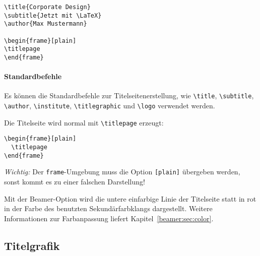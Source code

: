 \begin{minipage}{0.5\textwidth}
\begin{verbatim}
\title{Corporate Design}
\subtitle{Jetzt mit \LaTeX}
\author{Max Mustermann}

\begin{frame}[plain]
\titlepage
\end{frame}
\end{verbatim}
\end{minipage}

\begin{minipage}{0.5\textwidth}
\end{minipage}

\paragraph{Standardbefehle}

Es können die Standardbefehle zur Titelseitenerstellung, wie
\lstinline{\title},
\lstinline{\subtitle},
\lstinline{\author},
\lstinline{\institute},
\lstinline{\titlegraphic}
und \lstinline{\logo} verwendet werden.

Die Titelseite wird normal mit \lstinline{\titlepage} erzeugt:

\begin{lstlisting}
\begin{frame}[plain]
  \titlepage
\end{frame}
\end{lstlisting}

\emph{Wichtig:} Der \lstinline{frame}-Umgebung muss die Option
\lstinline{[plain]} übergeben werden,
sonst kommt es zu einer falschen Darstellung!

\begin{Declaration}
\end{Declaration}

Mit der Beamer-Option  wird die untere einfarbige Linie
der Titelseite statt in rot in der Farbe des benutzten Sekundärfarbklangs
dargestellt. Weitere Informationen zur Farbanpassung liefert
Kapitel~\ref{beamer:sec:color}.


\subsection{Titelgrafik}

\begin{Declaration}
\end{Declaration}

